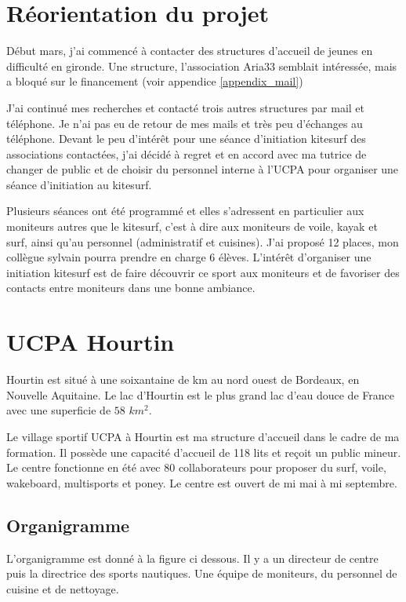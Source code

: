 \documentclass[11pt,a4paper]{report}
\begin{document}
\section{Réorientation du projet}

Début mars, j'ai commencé à contacter des structures d'accueil de jeunes 
en difficulté en gironde. Une structure, l'association Aria33 semblait 
intéressée, mais a bloqué sur le financement (voir appendice \ref{appendix_mail})

J'ai continué mes recherches et contacté trois autres structures par mail et
téléphone. Je n'ai pas eu de retour de mes mails et très peu d'échanges 
au téléphone. 
Devant le peu d’intérêt pour une séance d'initiation kitesurf
des associations contactées, j'ai décidé à regret et en accord avec ma tutrice
de changer de public et de choisir du personnel interne à l'UCPA pour organiser
une séance d'initiation au kitesurf. 

Plusieurs séances ont été programmé et elles s'adressent en particulier
aux moniteurs autres que le kitesurf, c'est à dire aux moniteurs de voile,
kayak et surf, ainsi qu'au personnel (administratif et cuisines).
J'ai  proposé 12 places, mon collègue sylvain pourra prendre en charge 6 élèves.
L'intér\^et d'organiser une initiation kitesurf est de faire découvrir ce
sport aux moniteurs et  de favoriser des contacts entre moniteurs dans
une bonne ambiance.

\section{UCPA Hourtin}
Hourtin est situé à une soixantaine de km au nord ouest de Bordeaux,
en Nouvelle Aquitaine. Le lac d'Hourtin est le plus grand lac d'eau
douce de France avec une superficie de $58 \,\,km^2$.

Le village sportif UCPA à Hourtin est ma structure d'accueil dans le cadre de
ma formation. Il possède une capacité d'accueil de 118 lits et reçoit un 
public mineur. Le centre fonctionne en été avec 80 collaborateurs pour
proposer du surf, voile, wakeboard, multisports et poney.
Le centre est ouvert de mi mai à mi septembre.
 
\subsection{Organigramme}
L'organigramme est donné à la figure ci dessous. Il y a un directeur de centre
puis la directrice des sports nautiques. Une équipe de moniteurs, du
personnel de cuisine et de nettoyage.
\end{document}
